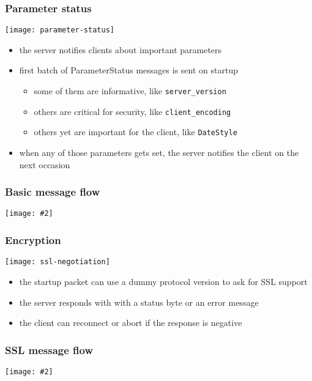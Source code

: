 \documentclass{beamer}
\newcommand{\mscdiagram}[2][1]{
  \begin{center}
    \texttt{[image: \#2]}
  \end{center}
}
\begin{document}
\begin{frame}
  \frametitle{Parameter status}

  \begin{center}
    \texttt{[image: parameter-status]}
  \end{center}

  \begin{itemize}
  \item the server notifies clients about important parameters
  \item first batch of ParameterStatus messages is sent on startup
    \begin{itemize}
    \item some of them are informative, like \texttt{server\_version}
    \item others are critical for security, like \texttt{client\_encoding}
    \item others yet are important for the client, like \texttt{DateStyle}
    \end{itemize}
  \item when any of those parameters gets set, the server notifies the client
    on the next occasion
  \end{itemize}
\end{frame}

\begin{frame}
  \frametitle{Basic message flow}

  \mscdiagram{basic-message-flow}
\end{frame}

\begin{frame}
  \frametitle{Encryption}

  \begin{center}
    \texttt{[image: ssl-negotiation]}
  \end{center}

  \begin{itemize}
  \item the startup packet can use a dummy protocol version to ask for SSL
    support
  \item the server responds with with a status byte or an error message
  \item the client can reconnect or abort if the response is negative
  \end{itemize}

\end{frame}

\begin{frame}
  \frametitle{SSL message flow}

  \mscdiagram{ssl-message-flow}
\end{frame}
\end{document}
